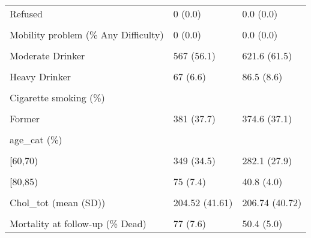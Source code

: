 \begin{table}[!h]
\begin{tabular}[t]{lll}
\addlinespace
Refused & 0 (0.0) & 0.0 (0.0)\\
\cellcolor{gray!6}{Don't know} & \cellcolor{gray!6}{0 (0.0)} & \cellcolor{gray!6}{0.0 (0.0)}\\
Mobility problem (\% Any Difficulty) & 0 (0.0) & 0.0 (0.0)\\
\cellcolor{gray!6}{Alcohol consumption (\%)} & \cellcolor{gray!6}{} & \cellcolor{gray!6}{}\\
Moderate Drinker & 567 (56.1) & 621.6 (61.5)\\
\addlinespace
\cellcolor{gray!6}{Non-Drinker} & \cellcolor{gray!6}{377 (37.3)} & \cellcolor{gray!6}{302.9 (30.0)}\\
Heavy Drinker & 67 (6.6) & 86.5 (8.6)\\
\cellcolor{gray!6}{DrinksPerWeek (mean (SD))} & \cellcolor{gray!6}{2.90 (6.24)} & \cellcolor{gray!6}{3.16 (6.36)}\\
Cigarette smoking (\%) &  & \\
\cellcolor{gray!6}{Never} & \cellcolor{gray!6}{468 (46.3)} & \cellcolor{gray!6}{477.5 (47.2)}\\
\addlinespace
Former & 381 (37.7) & 374.6 (37.1)\\
\cellcolor{gray!6}{Current} & \cellcolor{gray!6}{162 (16.0)} & \cellcolor{gray!6}{158.9 (15.7)}\\
age\_cat (\%) &  & \\
\cellcolor{gray!6}{[50,60)} & \cellcolor{gray!6}{375 (37.1)} & \cellcolor{gray!6}{527.9 (52.2)}\\
[60,70) & 349 (34.5) & 282.1 (27.9)\\
\addlinespace
\cellcolor{gray!6}{[70,80)} & \cellcolor{gray!6}{212 (21.0)} & \cellcolor{gray!6}{160.3 (15.9)}\\
[80,85) & 75 (7.4) & 40.8 (4.0)\\
\cellcolor{gray!6}{Chol\_HDL (mean (SD))} & \cellcolor{gray!6}{56.10 (16.58)} & \cellcolor{gray!6}{56.72 (16.11)}\\
Chol\_tot (mean (SD)) & 204.52 (41.61) & 206.74 (40.72)\\
\cellcolor{gray!6}{Blood\_Pressure (mean (SD))} & \cellcolor{gray!6}{131.18 (20.53)} & \cellcolor{gray!6}{129.19 (19.81)}\\
\addlinespace
Mortality at follow-up (\% Dead) & 77 (7.6) & 50.4 (5.0)\\
\bottomrule
\end{tabular}
\end{table}
